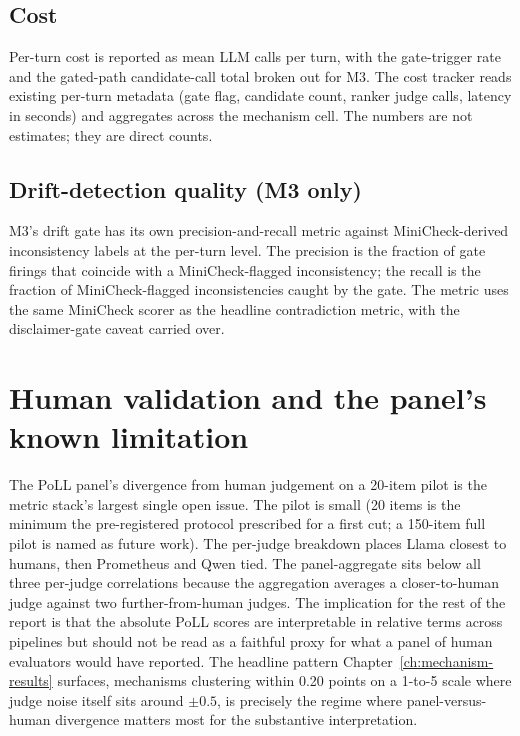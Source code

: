 \subsection{Cost}

Per-turn cost is reported as mean LLM calls per turn, with the gate-trigger rate and the gated-path candidate-call total broken out for M3. The cost tracker reads existing per-turn metadata (gate flag, candidate count, ranker judge calls, latency in seconds) and aggregates across the mechanism cell. The numbers are not estimates; they are direct counts.

\subsection{Drift-detection quality (M3 only)}

M3's drift gate has its own precision-and-recall metric against MiniCheck-derived inconsistency labels at the per-turn level. The precision is the fraction of gate firings that coincide with a MiniCheck-flagged inconsistency; the recall is the fraction of MiniCheck-flagged inconsistencies caught by the gate. The metric uses the same MiniCheck scorer as the headline contradiction metric, with the disclaimer-gate caveat carried over.

\section{Human validation and the panel's known limitation}

The PoLL panel's divergence from human judgement on a 20-item pilot is the metric stack's largest single open issue. The pilot is small (20 items is the minimum the pre-registered protocol prescribed for a first cut; a 150-item full pilot is named as future work). The per-judge breakdown places Llama closest to humans, then Prometheus and Qwen tied. The panel-aggregate sits below all three per-judge correlations because the aggregation averages a closer-to-human judge against two further-from-human judges. The implication for the rest of the report is that the absolute PoLL scores are interpretable in relative terms across pipelines but should not be read as a faithful proxy for what a panel of human evaluators would have reported. The headline pattern Chapter~\ref{ch:mechanism-results} surfaces, mechanisms clustering within 0.20 points on a 1-to-5 scale where judge noise itself sits around $\pm 0.5$, is precisely the regime where panel-versus-human divergence matters most for the substantive interpretation.


